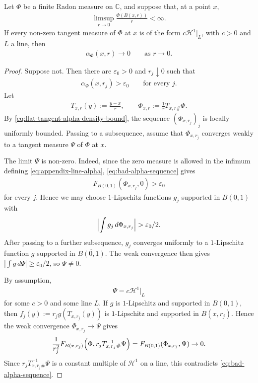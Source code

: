 \documentclass[11pt,a4paper,english,reqno]{amsart}
\newcommand{\hd}[1]{\mathcal{H}^{#1}}
\numberwithin{equation}{section}
\newcommand{\CC}[0]{\mathbb{C}}
\renewcommand{\epsilon}{\varepsilon}
\DeclarePairedDelimiter{\paren}{(}{)}
\DeclarePairedDelimiter{\abs}{\lvert}{\rvert}
\renewcommand{\restriction}{\big|}
\numberwithin{definition}{section}
\begin{document}
\begin{lemma}
  Let $\Phi$ be a finite Radon measure on $\CC$, and suppose that, at a point $x$,
  \begin{align}\label{eq:flat-tangent-alpha-density-bound}
    \limsup_{r\to0}\frac{\Phi(B(x,r))}{r}<\infty .
  \end{align}
  If every non-zero tangent measure of $\Phi$ at $x$ is of the form $c\hd1\restriction_L$, with $c>0$ and $L$ a line, then
  \begin{align}
    \alpha_{\Phi}(x,r)\to0
    \qquad\text{as }r\to0 .
  \end{align}
\end{lemma}
\begin{proof}
  Suppose not.  Then there are $\epsilon_0>0$ and $r_j\downarrow0$ such that
  \begin{align}\label{eq:bad-alpha-sequence}
    \alpha_{\Phi}(x,r_j)>\epsilon_0
    \qquad\text{for every }j.
  \end{align}
  Let
  \begin{align}
    T_{x,r}(y):=\frac{y-x}{r},
    \qquad
    \Phi_{x,r}:=\frac1r T_{x,r\#}\Phi .
  \end{align}
  By \cref{eq:flat-tangent-alpha-density-bound}, the sequence $(\Phi_{x,r_j})_j$ is locally uniformly bounded.  Passing to a subsequence, assume that $\Phi_{x,r_j}$ converges weakly to a tangent measure $\Psi$ of $\Phi$ at $x$.

  The limit $\Psi$ is non-zero.  Indeed, since the zero measure is allowed in the infimum defining \cref{eq:appendix-line-alpha}, \cref{eq:bad-alpha-sequence} gives
  \begin{align}
    F_{B(0,1)}(\Phi_{x,r_j},0)>\epsilon_0
  \end{align}
  for every $j$.  Hence we may choose $1$-Lipschitz functions $g_j$ supported in $B(0,1)$ with
  \begin{align}
    \abs[\Big]{\int g_j\,d\Phi_{x,r_j}}>\epsilon_0/2 .
  \end{align}
  After passing to a further subsequence, $g_j$ converges uniformly to a $1$-Lipschitz function $g$ supported in $\overline{B(0,1)}$.  The weak convergence then gives $|\int g\,d\Psi|\ge\epsilon_0/2$, so $\Psi\ne0$.

  By assumption,
  \begin{align}
    \Psi=c\hd1\restriction_L
  \end{align}
  for some $c>0$ and some line $L$.  If $g$ is $1$-Lipschitz and supported in $B(0,1)$, then $f_j(y):=r_j g(T_{x,r_j}(y))$ is $1$-Lipschitz and supported in $B(x,r_j)$.  Hence the weak convergence $\Phi_{x,r_j}\to\Psi$ gives
  \begin{align}
    \frac1{r_j^2}
    F_{B(x,r_j)} \paren[\Big]{\Phi,r_jT_{x,r_j}^{-1}{}_{\#}\Psi}
    =F_{B(0,1)}(\Phi_{x,r_j},\Psi)\to0 .
  \end{align}
  Since $r_jT_{x,r_j}^{-1}{}_{\#}\Psi$ is a constant multiple of $\hd1$ on a line, this contradicts \cref{eq:bad-alpha-sequence}.
\end{proof}
\end{document}
